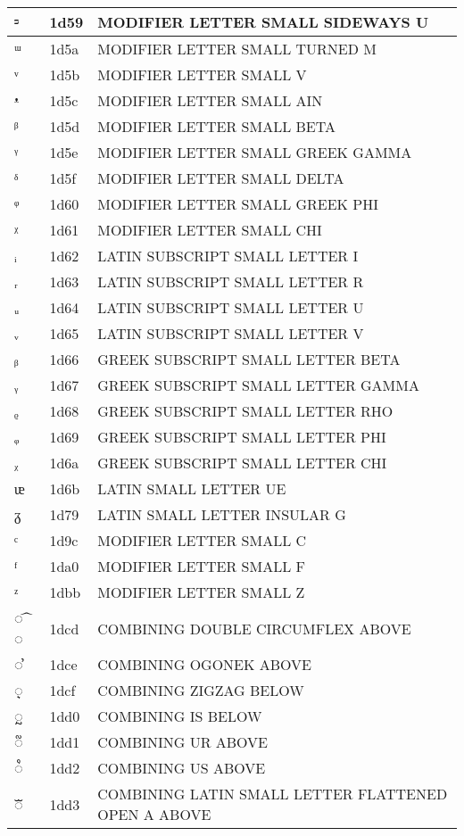 \documentclass[12pt,letterpaper,openany]{book}
\begin{document}
\begin{center}
\begin{supertabular}{|m{0.25in}|m{0.5in}|m{4in}|}
ᵙ & 1d59 & MODIFIER LETTER SMALL SIDEWAYS U\\\hline
ᵚ & 1d5a & MODIFIER LETTER SMALL TURNED M\\\hline
ᵛ & 1d5b & MODIFIER LETTER SMALL V\\\hline
ᵜ & 1d5c & MODIFIER LETTER SMALL AIN\\\hline
ᵝ & 1d5d & MODIFIER LETTER SMALL BETA\\\hline
ᵞ & 1d5e & MODIFIER LETTER SMALL GREEK GAMMA\\\hline
ᵟ & 1d5f & MODIFIER LETTER SMALL DELTA\\\hline
ᵠ & 1d60 & MODIFIER LETTER SMALL GREEK PHI\\\hline
ᵡ & 1d61 & MODIFIER LETTER SMALL CHI\\\hline
ᵢ & 1d62 & LATIN SUBSCRIPT SMALL LETTER I\\\hline
ᵣ & 1d63 & LATIN SUBSCRIPT SMALL LETTER R\\\hline
ᵤ & 1d64 & LATIN SUBSCRIPT SMALL LETTER U\\\hline
ᵥ & 1d65 & LATIN SUBSCRIPT SMALL LETTER V\\\hline
ᵦ & 1d66 & GREEK SUBSCRIPT SMALL LETTER BETA\\\hline
ᵧ & 1d67 & GREEK SUBSCRIPT SMALL LETTER GAMMA\\\hline
ᵨ & 1d68 & GREEK SUBSCRIPT SMALL LETTER RHO\\\hline
ᵩ & 1d69 & GREEK SUBSCRIPT SMALL LETTER PHI\\\hline
ᵪ & 1d6a & GREEK SUBSCRIPT SMALL LETTER CHI\\\hline
ᵫ & 1d6b & LATIN SMALL LETTER UE\\\hline
ᵹ & 1d79 & LATIN SMALL LETTER INSULAR G\\\hline
ᶜ & 1d9c & MODIFIER LETTER SMALL C\\\hline
ᶠ & 1da0 & MODIFIER LETTER SMALL F\\\hline
ᶻ & 1dbb & MODIFIER LETTER SMALL Z\\\hline
◌ ᷍ ◌ & 1dcd & COMBINING DOUBLE CIRCUMFLEX ABOVE\\\hline
◌ ᷎ & 1dce & COMBINING OGONEK ABOVE\\\hline
◌᷏ & 1dcf & COMBINING ZIGZAG BELOW\\\hline
◌᷐ & 1dd0 & COMBINING IS BELOW\\\hline
◌᷑ & 1dd1 & COMBINING UR ABOVE\\\hline
◌᷒ & 1dd2 & COMBINING US ABOVE\\\hline
◌ᷓ & 1dd3 & COMBINING LATIN SMALL LETTER FLATTENED OPEN A ABOVE\\\hline

\end{supertabular}
\end{center}
\end{document}

